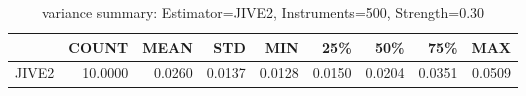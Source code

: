 \begin{table}[ht]
\centering
\caption{variance summary: Estimator=JIVE2, Instruments=500, Strength=0.30}
\begin{tabular}{lrrrrrrrr}
\toprule
 & COUNT & MEAN & STD & MIN & 25\% & 50\% & 75\% & MAX \\
\midrule
JIVE2 & 10.0000 & 0.0260 & 0.0137 & 0.0128 & 0.0150 & 0.0204 & 0.0351 & 0.0509 \\
\bottomrule
\end{tabular}
\end{table}
